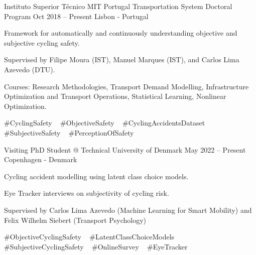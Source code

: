 

\begin{cventries}





  \cventry
    {Instituto Superior Técnico} %
    {MIT Portugal Transportation System Doctoral Program} %
    {Oct 2018 – Present} %
    {Lisbon - Portugal} %
    {
      \begin{cvitems} %
        \item {Framework for automatically and continuously understanding objective and subjective cycling safety.}
        \item {Supervised by Filipe Moura (IST), Manuel Marques (IST), and Carlos Lima Azevedo (DTU).}
        \item {Courses: Research Methodologies, Transport Demand Modelling, Infrastructure Optimization and Transport Operations, Statistical Learning, Nonlinear Optimization.}
      \end{cvitems}
    }
    {
      \#CyclingSafety ~
      \#ObjectiveSafety ~
      \#CyclingAccidentsDataset ~
      \#SubjectiveSafety ~
      \#PerceptionOfSafety ~
    }

  \cventryinner
    {Visiting PhD Student @ Technical University of Denmark} %
    {May 2022 – Present} %
    {Copenhagen - Denmark} %
    {
      \begin{cvitems} %
        \item {Cycling accident modelling using latent class choice models.}
        \item {Eye Tracker interviews on subjectivity of cycling risk.}
        \item {Supervised by Carlos Lima Azevedo (Machine Learning for Smart Mobility) and Felix Wilhelm Siebert (Transport Psychology)}
      \end{cvitems}
    }
    {
      \#ObjectiveCyclingSafety ~
      \#LatentClassChoiceModels ~
      \#SubjectiveCyclingSafety ~
      \#OnlineSurvey ~
      \#EyeTracker    
    }


\end{cventries}
